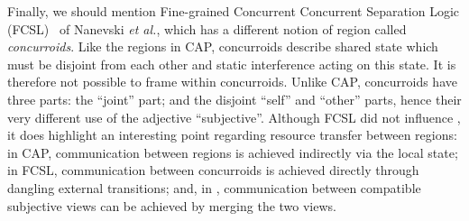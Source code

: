 


Finally, we should mention Fine-grained Concurrent Concurrent Separation Logic
(FCSL)~\cite{scsl-esop14} of Nanevski {\em et al.}, which has a different notion
of region called {\em concurroids}. Like the regions in CAP,  concurroids describe
shared state which must be disjoint from each other and static
interference acting on this state. It is therefore not
possible to frame within concurroids. Unlike CAP,
concurroids have three parts: the ``joint'' part;  and the disjoint
``self'' and ``other'' parts, hence  their very different use of  the adjective ``subjective''.
Although FCSL did  not influence \colosl, it does 
highlight  an interesting point regarding resource transfer between regions: in CAP, communication between regions is achieved indirectly via the local state; in FCSL, communication
between concurroids is achieved directly through dangling external
transitions; and, in \colosl, communication between compatible
subjective views can be achieved by merging the two views. 






